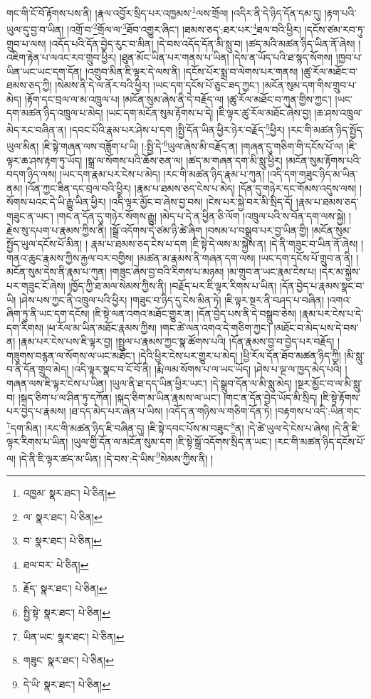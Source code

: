 གང་གི་ངོ་བོ་རྟོགས་པས་ནི། །རྣལ་འབྱོར་སྲིད་པར་འཁྱམས་\footnote{འཁྱམ་  སྣར་ཐང་།  པེ་ཅིན། }ལས་གྲོལ། །འདིར་ནི་དེ་ཉིད་དོན་དམ་དུ། །རྟག་པའི་ཡུལ་དུ་བྱ་བ་ཡིན། །འགྲོ་བ་\footnote{ལ་  སྣར་ཐང་།  པེ་ཅིན། }གྲོལ་ལ་\footnote{བ་  སྣར་ཐང་།  པེ་ཅིན། }ཐོབ་འགྱུར་ཞིང་། །ཐམས་ཅད་:ཐར་པར་\footnote{ཐལ་བར་  པེ་ཅིན། }ཐལ་བའི་ཕྱིར། །དངོས་ཙམ་རབ་ཏུ་གྲུབ་པ་ལས། །འདོད་པའི་དོན་བྱེད་རུང་བ་མིན། །དེ་བས་འདོད་དོན་མི་སླུ་བ། །ཚད་མའི་མཚན་ཉིད་ཡིན་ནོ་ཞེས། །འཇིག་རྟེན་པ་ལའང་རབ་གྲུབ་ཕྱིར། །ཐུན་མོང་ཡིན་པར་གནས་པ་ཡིན། །དེས་ན་ཡོད་པའི་ཐ་སྙད་སོགས། །ཁྱབ་པ་ཡིན་ཡང་ཡང་དག་དོན། །འགྲུབ་མིན་ཇི་ལྟར་དེ་ལས་ནི། །དངོས་པོར་སྨྲ་བ་ལེགས་པར་གནས། །ཚུ་རོལ་མཐོང་བ་ཐམས་ཅད་ཀྱི། །སེམས་ནི་དེ་ལ་ནོར་བའི་ཕྱིར། །ཡང་དག་དངོས་པོ་ཅུང་ཟད་ཀྱང་། །མངོན་སུམ་དག་གིས་གྲུབ་པ་མེད། །རྟོག་དང་བྲལ་ལ་མ་འཁྲུལ་པ། །མངོན་སུམ་ཞེས་ནི་དེ་བརྗོད་ལ། །ཚུ་རོལ་མཐོང་བ་ཀུན་གྱིས་ཀྱང་། །ཡང་དག་མཚན་ཉིད་འཁྲུལ་པ་མེད། །ཡང་དག་མངོན་སུམ་རྟོགས་པ་དེ། །ཇི་ལྟར་ཚུ་རོལ་མཐོང་ཞེས་བྱ། །ཆ་ཤས་འཁྲུལ་མེད་རང་བཞིན་ན། །དབང་པོའི་རྣམ་པར་ཤེས་པ་དག །སྤྱི་དོན་ཡིན་ཕྱིར་ཉེར་བརྗོད་\footnote{རྗོད་  སྣར་ཐང་།  པེ་ཅིན། }ཕྱིར། །རང་གི་མཚན་ཉིད་སྤྱོད་ཡུལ་མིན། །ཇི་སྟེ་གཞན་ལས་བཟློག་པ་ཡི། །:སྤྱི་དེ་\footnote{སྤྱི་སྟེ་  སྣར་ཐང་།  པེ་ཅིན། }ཡུལ་ཞེས་མི་བརྗོད་ན། །གཞན་དུ་གཅིག་གི་དངོས་པོ་ལ། །ཇི་ལྟར་ཆ་ཤས་རྟག་ཏུ་ཡོད། །སྒྲ་ལ་སོགས་པའི་ཆོས་ཅན་ལ། །ཚད་མ་གཞན་དག་མི་སླུ་ཕྱིར། །མངོན་སུམ་རྟོགས་པའི་བདག་ཉིད་ལས། །ཡང་དག་རྣམ་པར་ངེས་པ་མེད། །རང་གི་མཚན་ཉིད་རྣམ་པ་ཀུན། །འདི་དག་གཟུང་ཉིད་མ་ཡིན་ནམ། །འོན་ཀྱང་ཟིན་དང་བྲལ་བའི་ཕྱིར། །རྣམ་པ་ཐམས་ཅད་ངེས་པ་མེད། །དོན་དུ་གཉེར་དང་གོམས་འདུས་ལས། །སོགས་པའང་དེ་ཡི་རྒྱུ་ཡིན་ཕྱིར། །འདི་ལྟར་མྱོང་བ་ཞེས་བྱ་བས། །ངེས་པར་སྐྱེ་བར་མི་སྲིད་དོ། །རྣམ་པ་ཐམས་ཅད་གཟུང་ན་ཡང་། །གང་ན་དོན་དུ་གཉེར་སོགས་རྒྱུ། །མེད་པ་དེ་ན་ཕྱིན་ཅི་ལོག །འཁྲུལ་པའི་ས་བོན་དག་ལས་སྐྱེ། །རྗེས་སུ་དཔག་པ་རྣམས་ཀྱིས་ནི། །སྒྲོ་འདོགས་དེ་ཙམ་ཉི་ཚེ་ཞིག །བསམ་པ་བསྒྲུབ་པར་བྱ་ཡིན་གྱི། །མངོན་སུམ་སྤྱོད་ཡུལ་དངོས་པོ་མིན། །
རྣམ་པ་ཐམས་ཅད་ངེས་པ་དག །ཇི་སྟེ་དེ་ལས་མ་སྐྱེས་ན། །དེ་ནི་གཟུང་བ་ཡིན་ནོ་ཞེས། །གནའ་ཆུང་རྣམས་ཀྱིས་རྐྱལ་བར་བགྱིས། །མཚན་མ་རྣམས་ནི་གཞན་དག་ལས། །ཡང་དག་དངོས་པོ་གྲུབ་ན་ནི། །མངོན་སུམ་དེས་ནི་རྣམ་པ་ཀུན། །གཟུང་ཞེས་བྱ་བའི་རིགས་པ་མཉམ། །མ་གྲུབ་ན་ཡང་རྣམ་ངེས་པ། །དེར་མ་སྐྱེས་པར་གཟུང་ངོ་ཞེས། །ཁྱོད་ཀྱི་ཐ་མལ་སེམས་ཀྱིས་ནི། །བརྗོད་པར་ཇི་ལྟར་རིགས་པ་ཡིན། །དོན་བྱེད་པ་རྣམས་སྣང་བ་ཡི། །ཤེས་པས་ཀྱང་ནི་འཁྲུལ་པའི་ཕྱིར། །གཟུང་བ་ཉིད་དུ་ངེས་མིན་ཏེ། །ཇི་ལྟར་སྔར་ནི་བཤད་པ་བཞིན། །འགའ་ཞིག་ཏུ་ནི་ཡང་དག་དངོས། །ཇི་སྟེ་ལན་འགའ་མཐོང་གྱུར་ན། །དོན་བྱེད་པས་ནི་དེ་བསྒྲུབ་ཅེས། །རྣམ་པར་ངེས་པ་དེ་དག་རིགས། །ཕ་རོལ་མ་ཡིན་མཐོང་རྣམས་ཀྱིས། །གང་ཚེ་ལན་འགའ་དེ་གཅིག་ཀྱང་། །མཐོང་བ་མེད་པས་དེ་བས་ན། །རྣམ་པར་ངེས་པས་ཇི་ལྟར་བྱ། །སྤྲུལ་པ་རྣམས་ཀྱང་སྣ་ཚོགས་པའི། །དོན་རྣམས་བྱ་བ་བྱེད་པར་བརྗོད། །གཟུགས་བརྙན་ལ་སོགས་ལ་ཡང་མཐོང་། །དེའི་ཕྱིར་ངེས་པར་གྱུར་པ་མེད། །ཕྱི་རོལ་དོན་ཐོབ་མཚན་ཉིད་ཀྱི། །མི་སླུ་བ་ནི་དོན་གྲུབ་མེད། །འདི་ལྟར་སྣང་བ་ངོ་བོ་ནི། །རྨི་ལམ་སོགས་པ་ལ་ཡང་ཡོད། །ཤེས་པ་ལྔ་ལ་ཁྱད་མེད་པའི། །གཞན་ལས་ཇི་ལྟར་ངེས་པ་ཡིན། །ཡུལ་ནི་ཐ་དད་ཡིན་ཕྱིར་ཡང་། །དེ་སྒྲུབ་དོན་ལ་མི་སླུ་མེད། །སྔར་མྱོང་བ་ལ་མི་སླུ་བ། །སྐད་ཅིག་པ་ལ་ཤིན་ཏུ་དཀོན། །སྐད་ཅིག་མ་ཡིན་རྣམས་ལ་ཡང་། །གང་ན་དོན་བྱེད་ཡོད་མི་སྲིད། །ཇི་སྟེ་རྟོགས་པར་བྱེད་པ་རྣམས། །ཐ་དད་མེད་པར་ཞེན་པ་ཡིས། །འདོད་ན་གཉིས་ལ་གཅིག་དོན་ཏེ། །བརྟགས་པ་འདི་:ཡིན་གང་\footnote{ཡིན་ཡང་  སྣར་ཐང་།  པེ་ཅིན། }དག་མིན། །རང་གི་མཚན་ཉིད་ཇི་བཞིན་དུ། །ཇི་སྟེ་དབང་པོས་མ་བཟུང་\footnote{གཟུང་  སྣར་ཐང་།  པེ་ཅིན། }ན། །དེ་ཚེ་ཡུལ་དེ་ངེས་པ་ཞེས། །དེ་ནི་ཇི་ལྟར་རིགས་པ་ཡིན། །ཡུལ་གྱི་དོན་ལ་མངོན་སུམ་དག །ཇི་སྟེ་སྒྲོ་འདོགས་སྲིད་ན་ཡང་། །རང་གི་མཚན་ཉིད་དངོས་པོ་ལ། །དེ་ནི་ཇི་ལྟར་ཚད་མ་ཡིན། །དེ་བས་:དེ་ཡིས་\footnote{དེ་ཡི་  སྣར་ཐང་།  པེ་ཅིན། }སེམས་ཀྱིས་ནི། །
